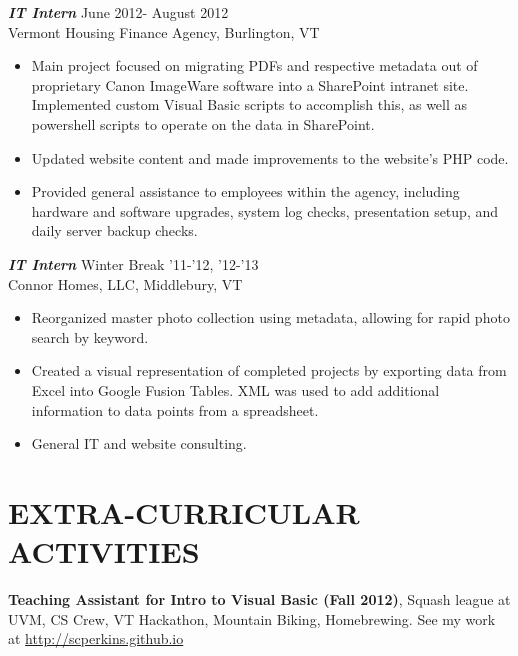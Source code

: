 \documentclass[line,margin]{res}
\begin{document}
\begin{resume}
                {\sl {\bfseries IT Intern}} \hfill June 2012- August 2012 \\
                Vermont Housing Finance Agency, Burlington, VT
                 \begin{itemize}  \itemsep -2pt 
                 \item Main project focused on migrating PDFs and respective metadata out of proprietary Canon ImageWare software into a SharePoint intranet site. Implemented custom Visual Basic scripts to accomplish this, as well as powershell scripts to operate on the data in SharePoint.
                 \item Updated website content and made improvements to the website's PHP code.
                 \item Provided general assistance to employees within the agency, including hardware and software upgrades, system log checks, presentation setup, and daily server backup checks.
                 \end{itemize} 

	      {\sl {\bfseries IT Intern}} \hfill Winter Break '11-'12, '12-'13 \\
	      Connor Homes, LLC, Middlebury, VT
	     \begin{itemize} \itemsep -2pt 
	      \item Reorganized master photo collection using metadata, allowing for rapid photo search by keyword.
                 \item Created a visual representation of completed projects by exporting data from Excel into Google Fusion Tables. XML 			      was used to add additional information to data points from a spreadsheet. 
                 \item General IT and website consulting.
                 \end{itemize} 
                
 
\section{EXTRA-CURRICULAR \\ ACTIVITIES}             
           {\bf Teaching Assistant for Intro to Visual Basic (Fall 2012)}, 
	Squash league at UVM,
            CS Crew,
            VT Hackathon, 
            Mountain Biking,
            Homebrewing.
	    See my work at \url{http://scperkins.github.io}
             

\end{resume}
\end{document}
